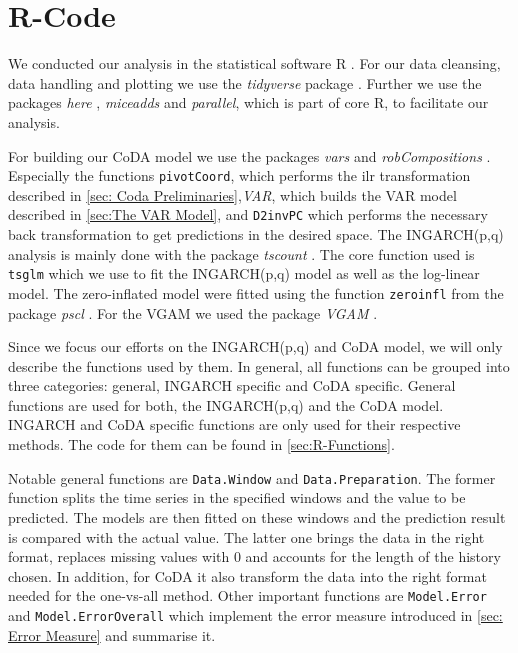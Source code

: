 \section{R-Code}
\label{sec:R-Code}

We conducted our analysis in the statistical software R \cite{R:2022}. For our data cleansing, data handling and plotting we use the \textit{tidyverse} package \cite{Tidyverse:2019}. Further we use the packages \textit{here} \cite{here:2020}, \textit{miceadds} \cite{Miceadds:2023} and \textit{parallel}, which is part of core R, to facilitate our analysis.  

For building our CoDA model we use the packages \textit{vars} \cite{VAR:2008,CoDAR2:2008} and \textit{robCompositions} \cite{RobComp:2011,CoDAR4:2018}. Especially the functions \texttt{pivotCoord}, which performs the ilr transformation described in \ref{sec: Coda Preliminaries},\textit{VAR}, which builds the VAR model described in \ref{sec:The VAR Model}, and \texttt{D2invPC} which performs the necessary back transformation to get predictions in the desired space. The INGARCH(p,q) analysis is mainly done with the package \textit{tscount} \cite{Tscount:2017,Tscount:2020}. The core function used is \texttt{tsglm} which we use to fit the INGARCH(p,q) model as well as the log-linear model. The zero-inflated model were fitted using the function \texttt{zeroinfl} from the package \textit{pscl} \cite{Pscl:2008}. For the VGAM we used the package \textit{VGAM} \cite{RVGAM:2010}. 

Since we focus our efforts on the INGARCH(p,q) and CoDA model, we will only describe the functions used by them. In general, all functions can be grouped into three categories: general, INGARCH specific and CoDA specific. General functions are used for both, the INGARCH(p,q) and the CoDA model. INGARCH and CoDA specific functions are only used for their respective methods. The code for them can be found in \ref{sec:R-Functions}. 

Notable general functions are \texttt{Data.Window} and \texttt{Data.Preparation}. The former function splits the time series in the specified windows and the value to be predicted. The models are then fitted on these windows and the prediction result is compared with the actual value. The latter one brings the data in the right format, replaces missing values with 0 and accounts for the length of the history chosen. In addition, for CoDA it also transform the data into the right format needed for the one-vs-all method. Other important functions are \texttt{Model.Error} and \texttt{Model.ErrorOverall} which implement the error measure introduced in \ref{sec: Error Measure} and summarise it. 

